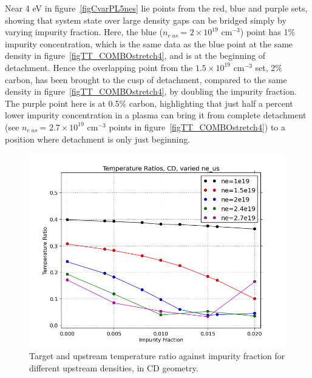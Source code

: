 \documentclass[12pt]{article}  %
\providecommand{\noNe}[1]{{${#1}\times 10^{19}$ cm$^{-3}$}} %
\providecommand{\neus}{$n_{e~us}~$} %
\begin{document}
Near 4 eV in figure~\ref{figCvarPL5nes} lie points from the red, blue and purple sets, showing that system state over large density gaps can be bridged simply by varying impurity fraction. Here, the blue (\neus = \noNe{2}) point has 1\% impurity concentration, which is the same data as the blue point at the same density in figure~\ref{figTT_COMBOstretch4}, and is at the beginning of detachment. Hence the overlapping point from the \noNe{1.5} set, 2\% carbon, has been brought to the cusp of detachment, compared to the same density in figure~\ref{figTT_COMBOstretch4}, by doubling the impurity fraction. The purple point here is at 0.5\% carbon, highlighting that just half a percent lower impurity concentration in a plasma can bring it from complete detachment (see \neus = \noNe{2.7} points in figure~\ref{figTT_COMBOstretch4}) to a position where detachment is only just beginning.

\begin{figure}
\includegraphics[scale=0.6]{Figures/sol1d/CvarTR5nes.png}
\centering
\caption{Target and upstream temperature ratio against impurity fraction for different upstream densities, in CD geometry.}\label{figCvarTR5nes}
\end{figure}
\end{document}
